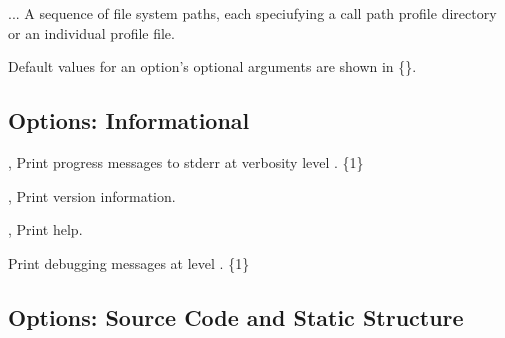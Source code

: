 \documentclass[english]{article}
\begin{document}
\begin{Description}
\item[\Arg{measurement-group}...] A sequence of file system paths,
each speciufying a call path profile directory or an individual profile file.
\end{Description}

Default values for an option's optional arguments are shown in \{\}.

\subsection{Options: Informational}

\begin{Description}

\item[\OptoArg{-v}{n}, \OptoArg{--verbose}{n}]
Print progress messages to stderr at verbosity level .  \{1\}

\item[\Opt{-V}, \Opt{--version}]
Print version information.

\item[\Opt{-h}, \Opt{--help}]
Print help.

\item[\OptoArg{--debug}{n}]
Print debugging messages at level . \{1\}

\end{Description}

\subsection{Options: Source Code and Static Structure}
\end{document}
